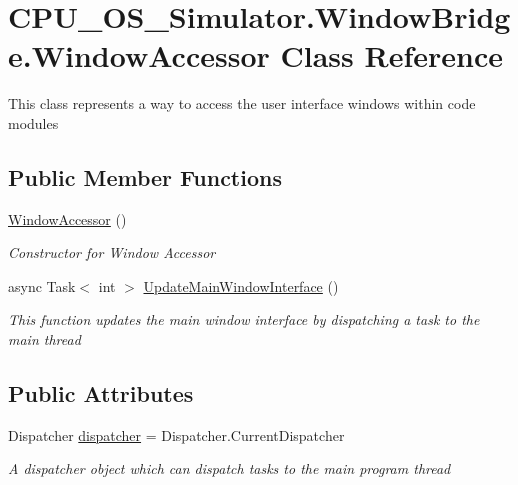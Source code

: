 \hypertarget{class_c_p_u___o_s___simulator_1_1_window_bridge_1_1_window_accessor}{}\section{C\+P\+U\+\_\+\+O\+S\+\_\+\+Simulator.\+Window\+Bridge.\+Window\+Accessor Class Reference}
\label{class_c_p_u___o_s___simulator_1_1_window_bridge_1_1_window_accessor}


This class represents a way to access the user interface windows within code modules  


\subsection*{Public Member Functions}
\begin{DoxyCompactItemize}
\item 
\hyperlink{class_c_p_u___o_s___simulator_1_1_window_bridge_1_1_window_accessor_a526e9c20ad587f6fb7522748d75e4977}{Window\+Accessor} ()
\begin{DoxyCompactList}\small\item\em Constructor for Window Accessor \end{DoxyCompactList}\item 
async Task$<$ int $>$ \hyperlink{class_c_p_u___o_s___simulator_1_1_window_bridge_1_1_window_accessor_af977260a6abab473be320e316ea924c6}{Update\+Main\+Window\+Interface} ()
\begin{DoxyCompactList}\small\item\em This function updates the main window interface by dispatching a task to the main thread \end{DoxyCompactList}\end{DoxyCompactItemize}
\subsection*{Public Attributes}
\begin{DoxyCompactItemize}
\item 
Dispatcher \hyperlink{class_c_p_u___o_s___simulator_1_1_window_bridge_1_1_window_accessor_ac0574a3bce05895b0806df96ee20e27f}{dispatcher} = Dispatcher.\+Current\+Dispatcher
\begin{DoxyCompactList}\small\item\em A dispatcher object which can dispatch tasks to the main program thread \end{DoxyCompactList}\end{DoxyCompactItemize}

